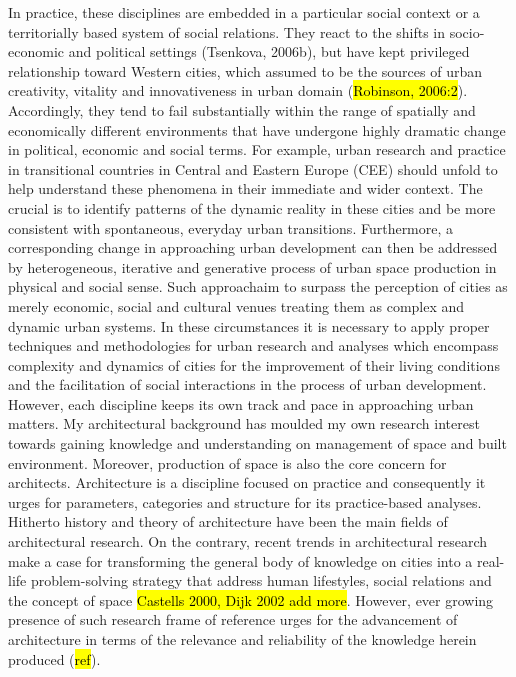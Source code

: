 \documentclass[11pt]{report}
\begin{document}
In practice, these disciplines are embedded in a particular social context or a territorially based system of social relations. They react to the shifts in socio-economic and political settings (Tsenkova, 2006b), but have kept privileged relationship toward Western cities, which assumed to be the sources of urban creativity, vitality and innovativeness in urban domain (\hl{Robinson, 2006:2}). Accordingly, they tend to fail substantially within the range of spatially and economically different environments that have undergone highly dramatic change in political, economic and social terms. For example, urban research and practice in transitional countries in Central and Eastern Europe (CEE) should unfold to help understand these phenomena in their immediate and wider context. The crucial is to identify patterns of the dynamic reality in these cities and be more consistent with spontaneous, everyday urban transitions. Furthermore, a corresponding change in approaching urban development can then be addressed by heterogeneous, iterative and generative process of urban space production in physical and social sense. Such approachaim to surpass the perception of cities as merely economic, social and cultural venues treating them as complex and dynamic urban systems. In these circumstances it is necessary to apply proper techniques and methodologies for urban research and analyses which encompass complexity and dynamics of cities for the improvement of their living conditions and the facilitation of social interactions in the process of urban development.
\\
However, each discipline keeps its own track and pace in approaching urban matters. My architectural background has moulded my own research interest towards gaining knowledge and understanding on management of space and built environment. Moreover, production of space is also the core concern for architects. Architecture is a discipline focused on practice and consequently it urges for parameters, categories and structure for its practice-based analyses. Hitherto history and theory of architecture have been the main fields of architectural research. On the contrary, recent trends in architectural research make a case for transforming the general body of knowledge on cities into a real-life problem-solving strategy that address human lifestyles, social relations and the concept of space \hl{Castells 2000, Dijk 2002 add more}. However, ever growing presence of such research frame of reference urges for the advancement of architecture in terms of the relevance and reliability of the knowledge herein produced (\hl{ref}).
\end{document}
